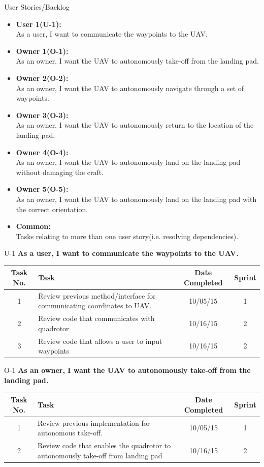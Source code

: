 \documentclass[11pt]{beamer}
\begin{document}
\begin{frame}{User Stories/Backlog}

\begin{itemize}
\item \textbf{User 1(U-1):}\\ As a user, I want to communicate the waypoints to the UAV.
\item \textbf{Owner 1(O-1):}\\ As an owner, I want the UAV to autonomously take-off from the landing pad.
\item \textbf{Owner 2(O-2):}\\ As an owner, I want the UAV to autonomously navigate through a set of waypoints.
\item \textbf{Owner 3(O-3):}\\ As an owner, I want the UAV to autonomously return to the location of the landing pad.
\item \textbf{Owner 4(O-4):}\\ As an owner, I want the UAV to autonomously land on the landing pad without damaging the craft.
\item \textbf{Owner 5(O-5):}\\ As an owner, I want the UAV to autonomously land on the landing pad with the correct orientation.
\item \textbf{Common:}\\ Tasks relating to more than one user story(i.e. resolving dependencies).
\end{itemize}

\end{frame}

\begin{frame}{U-1}
\textbf{As a user, I want to communicate the waypoints to the UAV.}
\begin{tabular}{| c | >{\raggedright}m{4cm} | c | c |}\hline
Task No. & Task & Date Completed & Sprint\\\hline
1 & Review previous method/interface for communicating coordinates to UAV. & 10/05/15 & 1 \\\hline
2 & Review code that communicates with quadrotor & 10/16/15 & 2 \\\hline
3 & Review code that allows a user to input waypoints & 10/16/15 & 2\\\hline

\end{tabular}
\end{frame}


\begin{frame}{O-1}
\textbf{As an owner, I want the UAV to autonomously take-off from the landing pad.}
\begin{tabular}{| c | >{\raggedright}m{4cm} | c | c |}\hline
Task No. & Task & Date Completed & Sprint\\\hline
1 & Review previous implementation for autonomous take-off. & 10/05/15 & 1 \\\hline
2 & Review code that enables the quadrotor to autonomously take-off from landing pad & 10/16/15 & 2 \\\hline
\end{tabular}
\end{frame}
\end{document}
